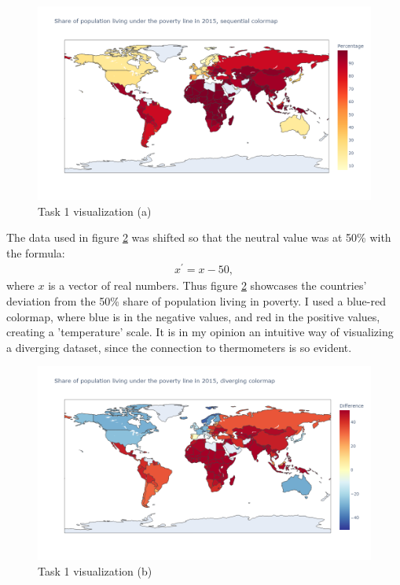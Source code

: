 \documentclass[11pt,a4paper,titlepage]{article}
\begin{document}
\begin{figure}[h]
    \centering
    \includegraphics[width=1.0\linewidth]{reports/assignment-3/imgs/task1-1.png}
    \caption{Task 1 visualization (a)}
    \label{fig:viz1}
\end{figure}

The data used in figure \ref{fig:viz2} was shifted so that the neutral value was at 50\% with the formula:
\begin{align*}
x^{\prime} = x - 50,
\end{align*}
where $x$ is a vector of real numbers. Thus figure \ref{fig:viz2} showcases the countries' deviation from the 50\% share of population living in poverty. I used a blue-red colormap, where blue is in the negative values, and red in the positive values, creating a 'temperature' scale. It is in my opinion an intuitive way of visualizing a diverging dataset, since the connection to thermometers is so evident.

\begin{figure}[h]
    \centering
    \includegraphics[width=1.0\linewidth]{reports/assignment-3/imgs/task1-2.png}
    \caption{Task 1 visualization (b)}
    \label{fig:viz2}
\end{figure}
\end{document}

